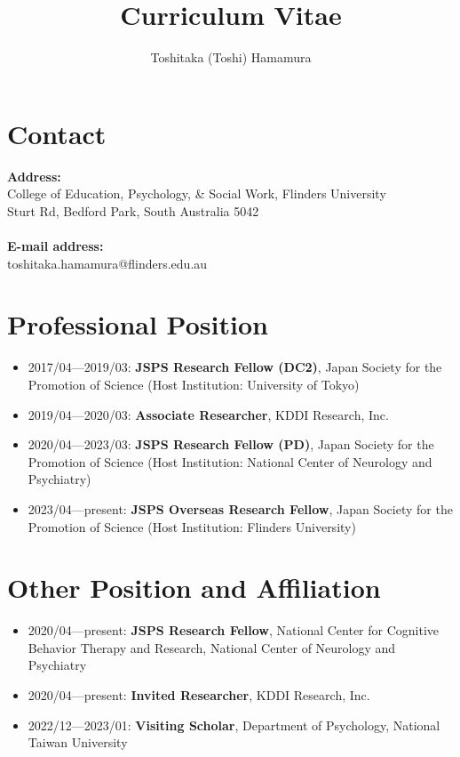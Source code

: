 \documentclass[a4paper]{article}
\begin{document}
\sloppy
\title{Curriculum Vitae}
\author{Toshitaka (Toshi) Hamamura}
\maketitle

\section{Contact}
\textbf{Address:}\\
College of Education, Psychology, \& Social Work, Flinders University\\
Sturt Rd, Bedford Park, South Australia 5042\\
\\
\textbf{E-mail address:}\\	
toshitaka.hamamura@flinders.edu.au

\section{Professional Position}
\begin{itemize}
	\item 2017/04---2019/03: \textbf{JSPS Research Fellow (DC2)}, Japan Society for the Promotion of Science (Host Institution: University of Tokyo)
	\item 2019/04---2020/03: \textbf{Associate Researcher}, KDDI Research, Inc.
	\item 2020/04---2023/03: \textbf{JSPS Research Fellow (PD)}, Japan Society for the Promotion of Science (Host Institution: National Center of Neurology and Psychiatry)
	\item 2023/04---present: \textbf{JSPS Overseas Research Fellow}, Japan Society for the Promotion of Science (Host Institution: Flinders University)
\end{itemize}

\section{Other Position and Affiliation}
\begin{itemize}
	\item 2020/04---present: \textbf{JSPS Research Fellow}, National Center for Cognitive Behavior Therapy and Research, National Center of Neurology and Psychiatry
	\item 2020/04---present: \textbf{Invited Researcher}, KDDI Research, Inc.
	\item 2022/12---2023/01: \textbf{Visiting Scholar}, Department of Psychology, National Taiwan University
\end{itemize}
\end{document}
